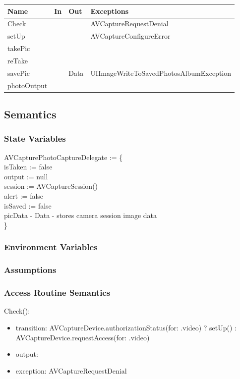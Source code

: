 \documentclass[12pt, titlepage]{article}
\begin{document}
\begin{center}
\begin{tabular}{p{4cm} p{3cm} p{4cm} p{4cm}}
\hline
\textbf{Name} & \textbf{In} & \textbf{Out} & \textbf{Exceptions} \\
\hline
Check & &  & AVCaptureRequestDenial \\
setUp & &  & AVCaptureConfigureError \\
takePic & &  & \\
reTake & &  & \\
savePic &  & Data & UIImageWriteToSavedPhotosAlbumException \\
photoOutput &  &  & \\
\hline
\end{tabular}
\end{center}

\subsection{Semantics}

\subsubsection{State Variables}
AVCapturePhotoCaptureDelegate := \{ \\
isTaken := false \\
output := null \\
session := AVCaptureSession()\\
alert := false\\
isSaved := false\\
picData - Data - stores camera session image data\\
\}\\

\subsubsection{Environment Variables}

\subsubsection{Assumptions}

\subsubsection{Access Routine Semantics}
\noindent Check():
\begin{itemize}
\item transition: AVCaptureDevice.authorizationStatus(for: .video) ? setUp() : AVCaptureDevice.requestAccess(for: .video)
\item output: 
\item exception: AVCaptureRequestDenial
\end{itemize}
\end{document}
